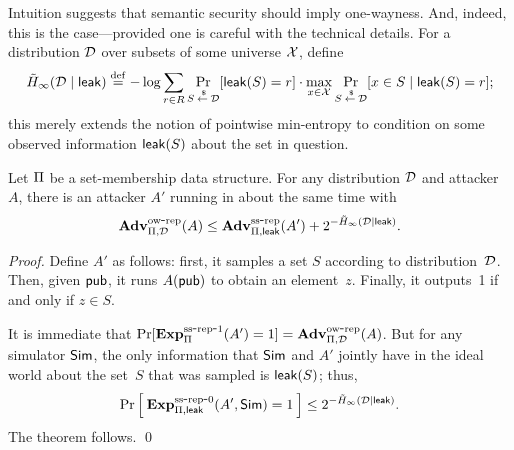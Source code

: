 Intuition suggests that semantic security should imply one-wayness. And, indeed, this is
the case---provided one is careful with the technical details.
For a distribution ${\cal D}$
over subsets of some universe ${\cal X}$, define
\[\tilde H_\infty({\cal D} \mid {\sf leak}) \stackrel{\rm def}{=} -\log \sum_{r \in R} \Pr_{S {\:\stackrel{{\scriptscriptstyle \hspace{0.2em}\$}} {\leftarrow}\:} {\cal D}}[{\sf leak}(S)=r] \cdot
\max_{x \in {\cal X}} \Pr_{S {\:\stackrel{{\scriptscriptstyle \hspace{0.2em}\$}} {\leftarrow}\:} {\cal D}}[x \in S \mid {\sf leak}(S)=r];\]
this merely extends the notion of pointwise min-entropy to condition on some
observed information ${\sf leak}(S)$ about the set in question.

\begin{theorem}
Let $\Pi$ be a set-membership data structure. For any distribution ${\cal D}$ and
attacker~$A$, there is an attacker $A'$ running in about the same time with
\[\mathrm{\mathbf{Adv}}^{\mathrm{ow\mbox{-}rep}}_{\Pi,\mathcal{D}}(A) \leq \mathrm{\mathbf{Adv}}^{\mathrm{ss\mbox{-}rep}}_{\Pi,{\sf
    leak}}(A') + 2^{-\tilde H_\infty({\cal D} \mid {\sf leak})}.\]
\end{theorem}
\begin{proof}
Define $A'$ as follows: first, it samples a set $S$ according to
distribution~${\cal D}$. Then, given ${\sf pub}$, it runs $A({\sf pub})$ to obtain an element~$z$.
Finally, it outputs~1 if and only if $z \in S$.

It is immediate that $\Pr[\mathrm{\mathbf{Exp}}^{\mathrm{ss\mbox{-}rep\mbox{-}1}}_{\Pi}(A')=1] = \mathrm{\mathbf{Adv}}^{\mathrm{ow\mbox{-}rep}}_{\Pi,\mathcal{D}}(A)$.
But for any simulator ${\sf Sim}$,
the only information
that ${\sf Sim}$
and $A'$ jointly have in the ideal world
about the set~$S$ that was sampled is ${\sf leak}(S)$; thus,
\[\Pr\left[\: \mathrm{\mathbf{Exp}}^{\mathrm{ss\mbox{-}rep\mbox{-}0}}_{\Pi,{\sf leak}}(A', {\sf Sim})=1 \:\right] \leq
2^{-\tilde H_\infty({\cal D} \mid {\sf leak})}.\]
The theorem follows. \hfill\qed
\end{proof}




